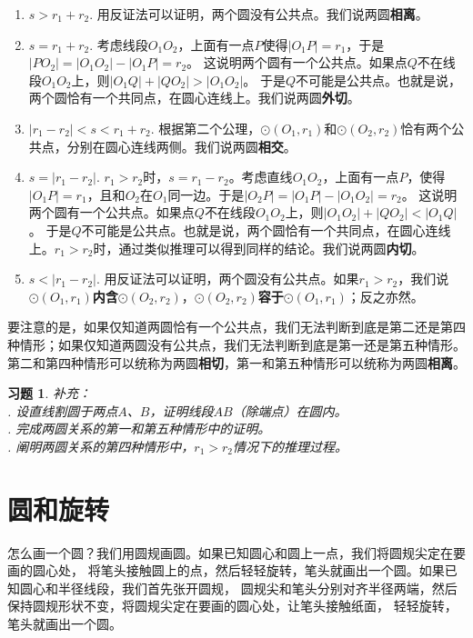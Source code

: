 \documentclass[12pt,UTF8]{ctexbook}
\newtheorem{xt}{习题}[section]
\begin{document}
\begin{enumerate}
    \item $s > r_1 + r_2.$ 用反证法可以证明，两个圆没有公共点。我们说两圆\textbf{相离}。
    \item $s = r_1 + r_2.$ 考虑线段$O_1O_2$，上面有一点$P$使得$|O_1P| = r_1$，于是$|PO_2| = |O_1O_2| - |O_1P| = r_2$。
    这说明两个圆有一个公共点。如果点$Q$不在线段$O_1O_2$上，则$|O_1Q| + |QO_2| > |O_1O_2|$。
    于是$Q$不可能是公共点。也就是说，两个圆恰有一个共同点，在圆心连线上。我们说两圆\textbf{外切}。
    \item $|r_1 - r_2| < s < r_1 + r_2.$ 根据第二个公理，$\odot(O_1, r_1)$和$\odot(O_2, r_2)$恰有两个公共点，分别在圆心连线两侧。我们说两圆\textbf{相交}。
    \item $s = |r_1 - r_2|.$ $r_1 > r_2$时，$s = r_1 - r_2$。考虑直线$O_1O_2$，上面有一点$P$，使得$|O_1P| = r_1$，且和$O_2$在$O_1$同一边。于是$|O_2P| = |O_1P| - |O_1O_2| = r_2$。
    这说明两个圆有一个公共点。如果点$Q$不在线段$O_1O_2$上，则$|O_1O_2| + |QO_2| < |O_1Q|$。
    于是$Q$不可能是公共点。也就是说，两个圆恰有一个共同点，在圆心连线上。$r_1 > r_2$时，通过类似推理可以得到同样的结论。我们说两圆\textbf{内切}。
    \item $s < |r_1 - r_2|.$ 用反证法可以证明，两个圆没有公共点。如果$r_1 > r_2$，我们说$\odot(O_1, r_1)$\textbf{内含}$\odot(O_2, r_2)$，$\odot(O_2, r_2)$\textbf{容于}$\odot(O_1, r_1)$；反之亦然。
\end{enumerate}
要注意的是，如果仅知道两圆恰有一个公共点，我们无法判断到底是第二还是第四种情形；如果仅知道两圆没有公共点，我们无法判断到底是第一还是第五种情形。
第二和第四种情形可以统称为两圆\textbf{相切}，第一和第五种情形可以统称为两圆\textbf{相离}。

\begin{xt}\label{xt:0-0-0}
    补充：\\
    . 设直线割圆于两点$A$、$B$，证明线段$AB$（除端点）在圆内。\\
    . 完成两圆关系的第一和第五种情形中的证明。\\
    . 阐明两圆关系的第四种情形中，$r_1 > r_2$情况下的推理过程。
\end{xt}

\section{圆和旋转}
怎么画一个圆？我们用圆规画圆。如果已知圆心和圆上一点，我们将圆规尖定在要画的圆心处，
将笔头接触圆上的点，然后轻轻旋转，笔头就画出一个圆。如果已知圆心和半径线段，我们首先张开圆规，
圆规尖和笔头分别对齐半径两端，然后保持圆规形状不变，将圆规尖定在要画的圆心处，让笔头接触纸面，
轻轻旋转，笔头就画出一个圆。
\end{document}
